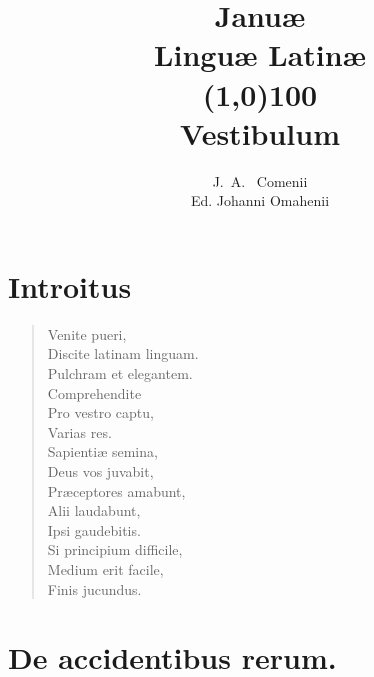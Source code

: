 \documentclass[12pt,  postvopaper]{memoir}
\author{J.~A.~ Comenii\\
\small{Ed. Johanni Omahenii}}
\title{Januæ\\
Linguæ Latinæ \\
\line(1,0){100} \\
\large{Vestibulum}}
\begin{document}
\maketitle

\chapter{Introitus}
\begin{verse}

  Venite pueri,\\
  Discite latinam linguam.\\
  Pulchram et elegantem.\\
  Comprehendite\\
  Pro vestro captu,\\
  Varias res.\\
  Sapientiæ semina,\\
  Deus vos juvabit,\\
  Præceptores amabunt,\\
  Alii laudabunt,\\
  Ipsi gaudebitis.\\
  Si principium difficile,\\
  Medium erit facile,\\
  Finis jucundus.\\
\end{verse}


\chapter{De accidentibus rerum.}
\end{document}
